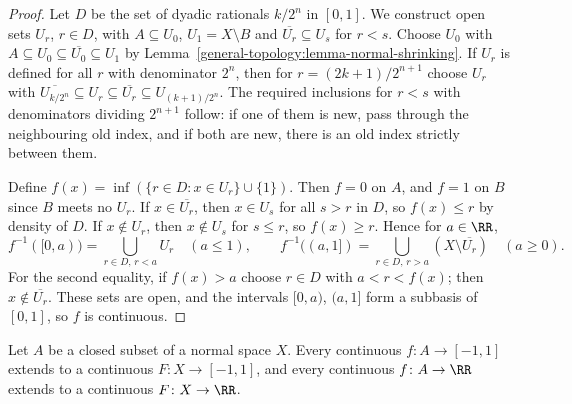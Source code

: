 \begin{proof}
Let $D$ be the set of dyadic rationals $k/2^n$ in $[0, 1]$. We construct open sets $U_r$, $r \in D$, with $A \subseteq U_0$, $U_1 = X \setminus B$ and
$\overline{U_r} \subseteq U_s$ for $r < s$. Choose $U_0$ with $A \subseteq U_0 \subseteq \overline{U_0} \subseteq U_1$ by
Lemma~\ref{general-topology:lemma-normal-shrinking}. If $U_r$ is defined for all $r$ with denominator $2^n$, then for $r = (2k+1)/2^{n+1}$ choose $U_r$
with $\overline{U_{k/2^n}} \subseteq U_r \subseteq \overline{U_r} \subseteq U_{(k+1)/2^n}$. The required inclusions for $r < s$ with denominators dividing
$2^{n+1}$ follow: if one of them is new, pass through the neighbouring old index, and if both are new, there is an old index strictly between them.

Define $f(x) = \inf(\{r \in D : x \in U_r\} \cup \{1\})$. Then $f = 0$ on $A$, and $f = 1$ on $B$ since $B$ meets no $U_r$. If $x \in \overline{U_r}$, then
$x \in U_s$ for all $s > r$ in $D$, so $f(x) \leq r$ by density of $D$. If $x \notin U_r$, then $x \notin U_s$ for $s \leq r$, so $f(x) \geq r$. Hence for
$a \in \RR$,
\[
f^{-1}([0, a)) = \bigcup_{r \in D,\, r < a} U_r \quad (a \leq 1), \qquad f^{-1}((a, 1]) = \bigcup_{r \in D,\, r > a} (X \setminus \overline{U_r}) \quad (a \geq 0).
\]
For the second equality, if $f(x) > a$ choose $r \in D$ with $a < r < f(x)$; then $x \notin \overline{U_r}$. These sets are open, and the intervals
$[0, a)$, $(a, 1]$ form a subbasis of $[0, 1]$, so $f$ is continuous.
\end{proof}

\begin{theorem}\label{general-topology:theorem-tietze}
Let $A$ be a closed subset of a normal space $X$. Every continuous $f \colon A \to [-1, 1]$ extends to a continuous $F \colon X \to [-1, 1]$, and every
continuous $f \colon A \to \RR$ extends to a continuous $F \colon X \to \RR$.
\end{theorem}

